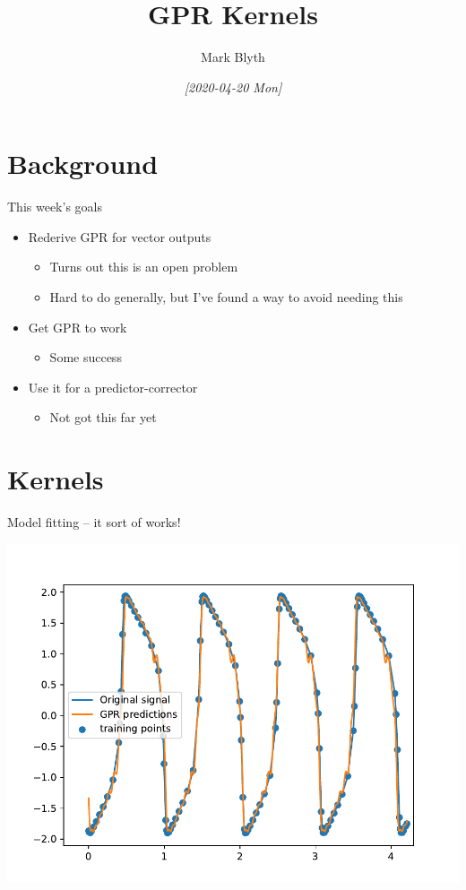 \documentclass[presentation]{beamer}
\author{Mark Blyth}
\date{\textit{[2020-04-20 Mon]}}
\title{GPR Kernels}
\begin{document}
\maketitle

\section{Background}
\label{sec:orgf6c7bd8}
\begin{frame}[label={sec:orgcc330c9}]{This week's goals}
\begin{itemize}
\item Rederive GPR for vector outputs
\begin{itemize}
\item Turns out this is an open problem
\item Hard to do generally, but I've found a way to avoid needing this
\end{itemize}
\item Get GPR to work
\begin{itemize}
\item Some success
\end{itemize}
\item Use it for a predictor-corrector
\begin{itemize}
\item Not got this far yet
\end{itemize}
\end{itemize}
\end{frame}

\section{Kernels}
\label{sec:orge3b22d2}
\begin{frame}[label={sec:org5a6045a}]{Model fitting -- it sort of works!}
\begin{center}
\includegraphics[height=.9\textheight]{./gpr1.pdf}
\end{center}
\end{frame}
\end{document}

